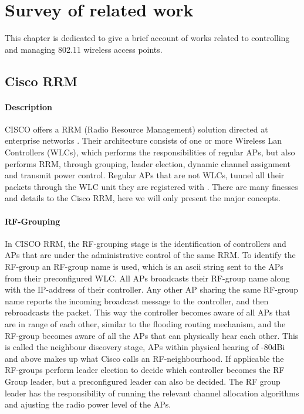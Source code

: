 \chapter{Survey of related work}
This chapter is dedicated to give a brief account of works related to controlling and managing 802.11 wireless access points. 

\section{Cisco RRM}
\subsubsection{Description}
CISCO offers a RRM (Radio Resource Management) solution directed at enterprise networks \cite{ciscoRRM}.
Their architecture consists of one or more Wireless Lan Controllers (WLCs), which performs the responsibilities of regular APs, 
but also performs RRM, through grouping, leader election, dynamic channel assignment and transmit power control. Regular APs that 
are not WLCs, tunnel all their packets through the WLC unit they are registered with \cite{cisco_2009}. There are many finesses and details to the Cisco RRM, here we will only present the
major concepts.

\subsubsection{RF-Grouping}
In CISCO RRM, the RF-grouping stage is the identification of controllers and APs that are under the administrative control of the same RRM. 
To identify the RF-group an RF-group name is used, which is an ascii string sent to the APs from their preconfigured WLC. 
All APs broadcasts their RF-group name along with the IP-address of their controller.
Any other AP sharing the same RF-group name reports the incoming broadcast message to the controller, and then rebroadcasts the packet. 
This way the controller becomes aware of all APs that are in range of each other, similar to the flooding routing mechanism,
and the RF-group becomes aware of all the APs that can physically hear each other.
This is called the neighbour discovery stage, APs within physical hearing of -80dBi and above makes up what Cisco calls an RF-neighbourhood.
If applicable the RF-groups perform leader election to decide which controller becomes the RF Group leader, but a preconfigured leader can also be decided.
The RF group leader has the responsibility of running the relevant channel allocation algorithms and ajusting the radio power level of the APs. 

